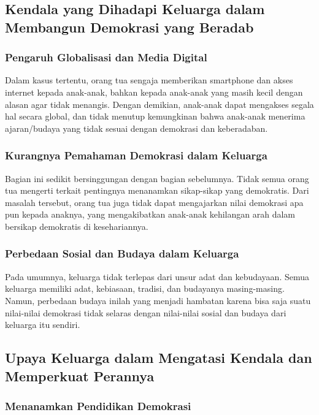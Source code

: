 \subsection{Kendala yang Dihadapi Keluarga dalam Membangun Demokrasi yang Beradab}

\subsubsection{Pengaruh Globalisasi dan Media Digital}

Dalam kasus tertentu, orang tua sengaja memberikan smartphone dan akses internet kepada anak-anak, bahkan kepada anak-anak yang masih kecil dengan alasan agar tidak menangis. Dengan demikian, anak-anak dapat mengakses segala hal secara global, dan tidak menutup kemungkinan bahwa anak-anak menerima ajaran/budaya yang tidak sesuai dengan demokrasi dan keberadaban.

\subsubsection{Kurangnya Pemahaman Demokrasi dalam Keluarga}

Bagian ini sedikit bersinggungan dengan bagian sebelumnya. Tidak semua orang tua mengerti terkait pentingnya menanamkan sikap-sikap yang demokratis. Dari masalah tersebut, orang tua juga tidak dapat mengajarkan nilai demokrasi apa pun kepada anaknya, yang mengakibatkan anak-anak kehilangan arah dalam bersikap demokratis di kesehariannya.

\subsubsection{Perbedaan Sosial dan Budaya dalam Keluarga}

Pada umumnya, keluarga tidak terlepas dari unsur adat dan kebudayaan. Semua keluarga memiliki adat, kebiasaan, tradisi, dan budayanya masing-masing. Namun, perbedaan budaya inilah yang menjadi hambatan karena bisa saja suatu nilai-nilai demokrasi tidak selaras dengan nilai-nilai sosial dan budaya dari keluarga itu sendiri. 

\subsection{Upaya Keluarga dalam Mengatasi Kendala dan Memperkuat Perannya}

\subsubsection{Menanamkan Pendidikan Demokrasi}


